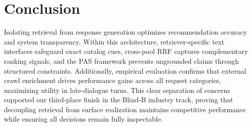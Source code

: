 \section{Conclusion}

Isolating retrieval from response generation optimizes recommendation accuracy and system transparency. Within this architecture, retriever-specific text interfaces safeguard exact catalog cues, cross-pool RRF captures complementary ranking signals, and the PAS framework prevents ungrounded claims through structured constraints. Additionally, empirical evaluation confirms that external crawl enrichment drives performance gains across all request categories, maximizing utility in late-dialogue turns. This clear separation of concerns supported our third-place finish in the Blind-B industry track, proving that decoupling retrieval from surface realization maintains competitive performance while ensuring all decisions remain fully inspectable.
